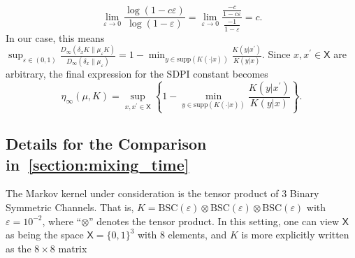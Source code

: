 \documentclass[conference,letterpaper]{IEEEtran}
\def \X{\mathsf X}
\def \supp {\mathrm{supp}}
\begin{document}
    \begin{equation*}
        \lim_{\varepsilon\to 0} \frac{\log\left(1-c\varepsilon\right)}{\log(1-\varepsilon)} = \lim_{\varepsilon\to 0}\frac{\frac{-c}{1-c\varepsilon}}{\frac{-1}{1-\varepsilon}} = c.
    \end{equation*}
    In our case, this means $\sup_{\varepsilon\in(0,1)} \frac{D_\infty(\delta_x K\|\mu_\varepsilon K)}{D_\infty(\delta_x\|\mu_\varepsilon)} = 1 -\min_{y\in\supp(K(\cdot|x))} \frac{K(y|x^\prime)}{K(y|x)}$. Since $x, x^\prime\in\X$ are arbitrary, the final expression for the SDPI constant becomes
    \begin{equation*}
        \eta_\infty(\mu, K) = \sup_{x, x^\prime\in\X}\left\{1 -\min_{y\in\supp(K(\cdot|x))} \frac{K(y|x^\prime)}{K(y|x)}\right\}.
    \end{equation*}
\subsection{Details for the Comparison in~\cref{section:mixing_time}}\label{appendix:mixing_time_experiment}\noindent
    The Markov kernel under consideration is the tensor product of 3 Binary Symmetric Channels. That is, ${K=\mathrm{BSC}(\varepsilon)\otimes \mathrm{BSC}(\varepsilon)\otimes \mathrm{BSC}(\varepsilon)}$ with $\varepsilon=10^{-2}$, where ``$\otimes$'' denotes the tensor product. In this setting, one can view $\X$ as being the space $\X=\{0,1\}^3$ with 8 elements, and $K$ is more explicitly written as the $8\times8$ matrix
\end{document}
